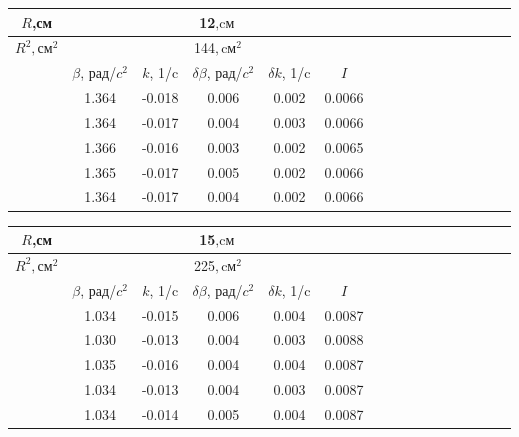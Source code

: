 \documentclass[14pt]{article}
\begin{document}
\begin{center}
\begin{tabular}{|c|c|c|c|c|c|c|c|c|c|c|c|c|c|c|c|}
\hline
$R$,см	&	\multicolumn{5}{|c|}{12$, \text{cм}$}			\\
\hline
$R^2, \text{см}^2$	&	\multicolumn{5}{|c|}{144$, \text{cм}^2$}			\\
\hline
		&	$\beta$, рад/$c^2$	&	$k$, 1/c	&	$\delta\beta$, рад/$c^2$	&	$\delta k$, 1/c		&	$I$		\\
\hline
		&	1.364				&	-0.018		&	0.006						&	0.002				&	0.0066	\\
\hline
		&	1.364				&	-0.017		&	0.004						&	0.003				&	0.0066	\\
\hline
		&	1.366				&	-0.016		&	0.003						&	0.002				&	0.0065	\\
\hline
		&	1.365				&	-0.017		&	0.005						&	0.002				&	0.0066	\\
\hline
		&	1.364				&	-0.017		&	0.004						&	0.002				&	0.0066	\\
\hline
\end{tabular}
\end{center}

\begin{center}
\begin{tabular}{|c|c|c|c|c|c|c|c|c|c|c|c|c|c|c|c|}
\hline
$R$,см	&	\multicolumn{5}{|c|}{15$, \text{cм}$}			\\
\hline
$R^2, \text{см}^2$	&	\multicolumn{5}{|c|}{225$, \text{cм}^2$}			\\
\hline
		&	$\beta$, рад/$c^2$	&	$k$, 1/c	&	$\delta\beta$, рад/$c^2$	&	$\delta k$, 1/c		&	$I$		\\
\hline
		&	1.034				&	-0.015		&	0.006						&	0.004				&	0.0087	\\
\hline
		&	1.030				&	-0.013		&	0.004						&	0.003				&	0.0088	\\
\hline
		&	1.035				&	-0.016		&	0.004						&	0.004				&	0.0087	\\
\hline
		&	1.034				&	-0.013		&	0.004						&	0.003				&	0.0087	\\
\hline
		&	1.034				&	-0.014		&	0.005						&	0.004				&	0.0087	\\
\hline
\end{tabular}
\end{center}
\end{document}
